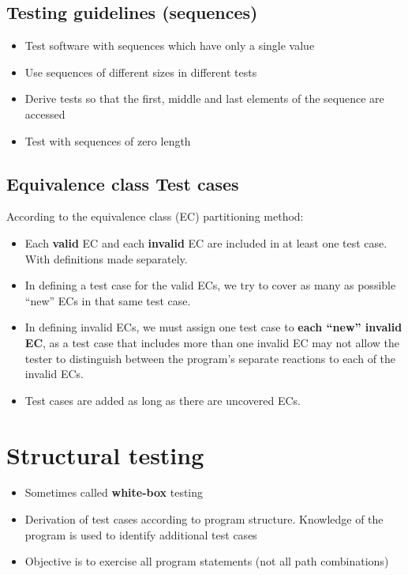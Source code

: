 \documentclass{article}
\begin{document}
\subsection{Testing guidelines (sequences)}

\begin{itemize}
  \item Test software with sequences which have only a single value
  \item Use sequences of different sizes in different tests
  \item Derive tests so that the first, middle and last elements of the sequence are accessed
  \item Test with sequences of zero length
\end{itemize}

\subsection{Equivalence class Test cases}

\begin{flushleft}
According to the equivalence class (EC) partitioning method:
\end{flushleft}
\begin{itemize} 
  \item Each \textbf{valid} EC and each \textbf{invalid} EC are included in at least one test case. With definitions made separately.
  \item In defining a test case for the valid ECs, we try to cover as many as possible “new” ECs in that same test case. 
  \item In defining invalid ECs, we must assign one test case to \textbf{each “new” invalid EC}, as a test case that includes more than one invalid EC may not allow the tester to distinguish between the program’s separate reactions to each of the invalid ECs. 
  \item Test cases are added as long as there are uncovered ECs.
\end{itemize}

\section{Structural testing}

\begin{itemize}
  \item Sometimes called \textbf{white-box} testing 
  \item Derivation of test cases according to program structure. Knowledge of the program is used to identify additional test cases 
  \item Objective is to exercise all program statements (not all path combinations)
\end{itemize}
\end{document}
